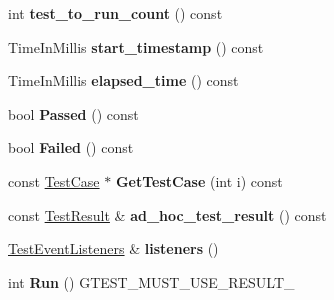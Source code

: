 \begin{DoxyCompactItemize}
\item 
\hypertarget{classtesting_1_1_unit_test_a953a52f89898a04ee4a4e08469407cd3}{}int {\bfseries test\+\_\+to\+\_\+run\+\_\+count} () const \label{classtesting_1_1_unit_test_a953a52f89898a04ee4a4e08469407cd3}

\item 
\hypertarget{classtesting_1_1_unit_test_adb9fdaf25b601f91bd55606941d05c80}{}Time\+In\+Millis {\bfseries start\+\_\+timestamp} () const \label{classtesting_1_1_unit_test_adb9fdaf25b601f91bd55606941d05c80}

\item 
\hypertarget{classtesting_1_1_unit_test_a87853e2fe9f0b172467534323cb9d267}{}Time\+In\+Millis {\bfseries elapsed\+\_\+time} () const \label{classtesting_1_1_unit_test_a87853e2fe9f0b172467534323cb9d267}

\item 
\hypertarget{classtesting_1_1_unit_test_a4ef49e958702bf741e7eaa4864e28a48}{}bool {\bfseries Passed} () const \label{classtesting_1_1_unit_test_a4ef49e958702bf741e7eaa4864e28a48}

\item 
\hypertarget{classtesting_1_1_unit_test_ad7711156d07d6037d8f497e5c385f78d}{}bool {\bfseries Failed} () const \label{classtesting_1_1_unit_test_ad7711156d07d6037d8f497e5c385f78d}

\item 
\hypertarget{classtesting_1_1_unit_test_a7967986c217975d4de70739d28b4109d}{}const \hyperlink{classtesting_1_1_test_case}{Test\+Case} $\ast$ {\bfseries Get\+Test\+Case} (int i) const \label{classtesting_1_1_unit_test_a7967986c217975d4de70739d28b4109d}

\item 
\hypertarget{classtesting_1_1_unit_test_ab4ecadf87d00bc67d15553e2998ef81d}{}const \hyperlink{classtesting_1_1_test_result}{Test\+Result} \& {\bfseries ad\+\_\+hoc\+\_\+test\+\_\+result} () const \label{classtesting_1_1_unit_test_ab4ecadf87d00bc67d15553e2998ef81d}

\item 
\hypertarget{classtesting_1_1_unit_test_a1b7387b0b3daa2433ed6b685027bf285}{}\hyperlink{classtesting_1_1_test_event_listeners}{Test\+Event\+Listeners} \& {\bfseries listeners} ()\label{classtesting_1_1_unit_test_a1b7387b0b3daa2433ed6b685027bf285}

\item 
\hypertarget{classtesting_1_1_unit_test_a2febc800536b44500565f4c423f359d3}{}int {\bfseries Run} () G\+T\+E\+S\+T\+\_\+\+M\+U\+S\+T\+\_\+\+U\+S\+E\+\_\+\+R\+E\+S\+U\+L\+T\+\_\+\label{classtesting_1_1_unit_test_a2febc800536b44500565f4c423f359d3}


\end{DoxyCompactItemize}
